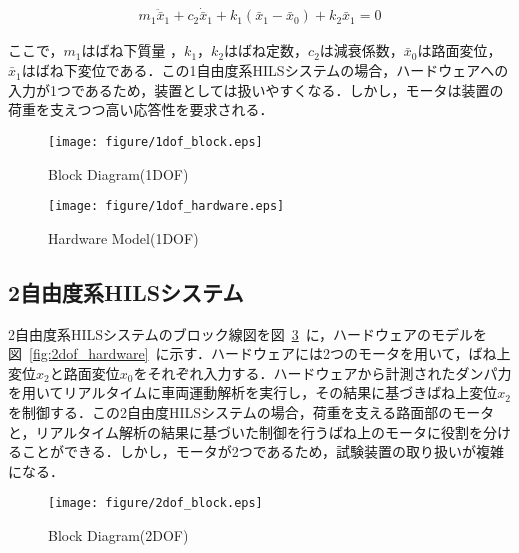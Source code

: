 \documentclass[a4paper,12pt]{article_vdlab_sotsuron}
\begin{document}
\vspace{-5mm}
\begin{eqnarray}
 \label{eq:1dof_m1} m_1\ddot{\bar x}_1 + c_2\dot{\bar x}_1 + k_1(\bar x_1-\bar x_0) + k_2\bar x_1 = 0
\end{eqnarray}

ここで，$m_1$はばね下質量 ，$k_1$，$k_2$はばね定数，$c_2$は減衰係数，$\bar x_0$は路面変位，$\bar x_1$はばね下変位である．この1自由度系HILSシステムの場合，ハードウェアへの入力が1つであるため，装置としては扱いやすくなる．しかし，モータは装置の荷重を支えつつ高い応答性を要求される．

\vspace*{10mm}
\begin{figure}[htp]
  \begin{center}
    \texttt{[image: figure/1dof\_block.eps]}
    \vspace*{3mm}
    \caption{Block Diagram(1DOF)}
    \label{fig:1dof_block}
  \end{center}
\end{figure}

\vspace*{10mm}
\begin{figure}[htp]
  \begin{center}
    \texttt{[image: figure/1dof\_hardware.eps]}
    \vspace*{3mm}
    \caption{Hardware Model(1DOF)}
    \label{fig:1dof_hardware}
  \end{center}
\end{figure}

\newpage
\subsection{2自由度系HILSシステム}
2自由度系HILSシステムのブロック線図を図~\ref{fig:2dof_block}~に，ハードウェアのモデルを図~\ref{fig:2dof_hardware}~に示す．ハードウェアには2つのモータを用いて，ばね上変位$x_2$と路面変位$x_0$をそれぞれ入力する．ハードウェアから計測されたダンパ力を用いてリアルタイムに車両運動解析を実行し，その結果に基づきばね上変位$x_2$を制御する．この2自由度HILSシステムの場合，荷重を支える路面部のモータと，リアルタイム解析の結果に基づいた制御を行うばね上のモータに役割を分けることができる．しかし，モータが2つであるため，試験装置の取り扱いが複雑になる．

\vspace*{10mm}
\begin{figure}[htp]
  \begin{center}
    \texttt{[image: figure/2dof\_block.eps]}
    \vspace*{3mm}
    \caption{Block Diagram(2DOF)}
    \label{fig:2dof_block}
  \end{center}
\end{figure}
\end{document}
